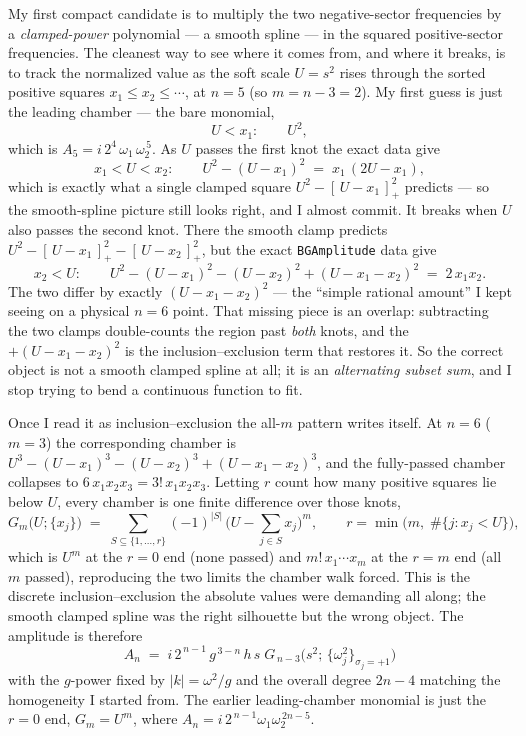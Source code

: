 \documentclass{article}
\newcommand{\pp}[1]{\left[\,#1\,\right]_{+}}
\begin{document}
My first compact candidate is to multiply the two negative-sector frequencies by
a \emph{clamped-power} polynomial --- a smooth spline --- in the squared
positive-sector frequencies. The cleanest way to see where it comes from, and
where it breaks, is to track the normalized value as the soft scale $U=s^2$ rises
through the sorted positive squares $x_1\le x_2\le\cdots$, at $n=5$ (so
$m=n-3=2$). My first guess is just the leading chamber --- the bare monomial,
\[
U<x_1:\qquad U^{2},
\]
which is $A_5=i\,2^{4}\,\omega_1\,\omega_2^{\,5}$. As $U$ passes the first knot the
exact data give
\[
x_1<U<x_2:\qquad U^2-(U-x_1)^2 \;=\; x_1\,(2U-x_1),
\]
which is exactly what a single clamped square $U^2-\pp{U-x_1}^2$ predicts --- so
the smooth-spline picture still looks right, and I almost commit. It breaks when
$U$ also passes the second knot. There the smooth clamp predicts
$U^2-\pp{U-x_1}^2-\pp{U-x_2}^2$, but the exact \texttt{BGAmplitude} data give
\[
x_2<U:\qquad U^2-(U-x_1)^2-(U-x_2)^2+(U-x_1-x_2)^2 \;=\; 2\,x_1 x_2 .
\]
The two differ by exactly $(U-x_1-x_2)^2$ --- the ``simple rational amount'' I
kept seeing on a physical $n=6$ point. That missing piece is an overlap:
subtracting the two clamps double-counts the region past \emph{both} knots, and
the $+(U-x_1-x_2)^2$ is the inclusion--exclusion term that restores it. So the
correct object is not a smooth clamped spline at all; it is an \emph{alternating
subset sum}, and I stop trying to bend a continuous function to fit.

Once I read it as inclusion--exclusion the all-$m$ pattern writes itself. At
$n=6$ ($m=3$) the corresponding chamber is
$U^3-(U-x_1)^3-(U-x_2)^3+(U-x_1-x_2)^3$, and the fully-passed chamber collapses to
$6\,x_1x_2x_3=3!\,x_1x_2x_3$. Letting $r$ count how many positive squares lie
below $U$, every chamber is one finite difference over those knots,
\[
G_m\big(U;\{x_j\}\big) \;=\; \sum_{S\subseteq\{1,\dots,r\}} (-1)^{|S|}\,
\Big(U-\sum_{j\in S} x_j\Big)^{m},
\qquad r=\min\big(m,\;\#\{j:x_j<U\}\big),
\]
which is $U^m$ at the $r=0$ end (none passed) and $m!\,x_1\cdots x_m$ at the
$r=m$ end (all $m$ passed), reproducing the two limits the chamber walk forced.
This is the discrete inclusion--exclusion the absolute values were demanding all
along; the smooth clamped spline was the right silhouette but the wrong object.
The amplitude is therefore
\[
\boxed{\;
A_n \;=\; i\,2^{\,n-1}\,g^{\,3-n}\,h\,s\;
G_{\,n-3}\!\big(s^2;\,\{\omega_j^2\}_{\sigma_j=+1}\big)\;}
\]
with the $g$-power fixed by $|k|=\omega^2/g$ and the overall degree $2n-4$
matching the homogeneity I started from. The earlier leading-chamber monomial is
just the $r=0$ end, $G_m=U^m$, where $A_n=i\,2^{\,n-1}\omega_1\omega_2^{\,2n-5}$.
\end{document}
